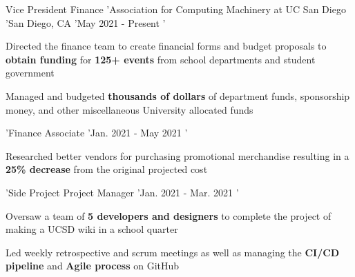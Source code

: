 

\begin{cventries}

\readlist\arg
  {Vice President Finance
  'Association for Computing Machinery at UC San Diego
  'San Diego, CA
  'May 2021 - Present
  '\begin{cvitems} %
	  \item Directed the finance team to create financial forms and budget proposals to \textbf{obtain funding} for \textbf{125+ events} from school departments and student government
	  \item Managed and budgeted \textbf{thousands of dollars} of department funds, sponsorship money, and other miscellaneous University allocated funds
	\end{cvitems}
  'Finance Associate
  'Jan. 2021 - May 2021
  '\begin{cvitems}
	\item Researched better vendors for purchasing promotional merchandise resulting in a \textbf{25\% decrease} from the original projected cost
   \end{cvitems}
   'Side Project Project Manager
   'Jan. 2021 - Mar. 2021
   '\begin{cvitems}
		  \item Oversaw a team of \textbf{5 developers and designers} to complete the project of making a UCSD wiki in a school quarter
		  \item Led weekly retrospective and scrum meetings as well as managing the \textbf{CI/CD pipeline} and \textbf{Agile process} on GitHub
	\end{cvitems}
  }
\end{cventries}
	